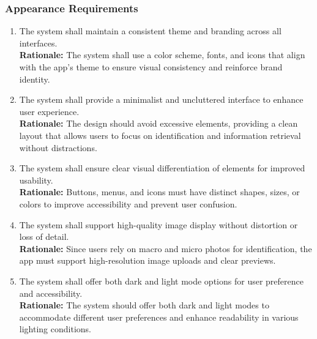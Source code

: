 \documentclass[]{article}
\begin{document}
\begin{enumerate}[{\bf BE1.}]
\subsubsection{Appearance Requirements}
\label{ssub:appearance_requirements}
\begin{enumerate}[{LF-A}1. ]
	\item The system shall maintain a consistent theme and branding across all interfaces.\\
	\textbf{Rationale:} The system shall use a color scheme, fonts, and icons that align with the app’s theme to ensure visual consistency and reinforce brand identity.
	\item The system shall provide a minimalist and uncluttered interface to enhance user experience.\\
	\textbf{Rationale:} The design should avoid excessive elements, providing a clean layout that allows users to focus on identification and information retrieval without distractions.
	\item The system shall ensure clear visual differentiation of elements for improved usability.\\
	\textbf{Rationale:} Buttons, menus, and icons must have distinct shapes, sizes, or colors to improve accessibility and prevent user confusion.
	\item The system shall support high-quality image display without distortion or loss of detail.\\
	\textbf{Rationale:} Since users rely on macro and micro photos for identification, the app must support high-resolution image uploads and clear previews.
	\item The system shall offer both dark and light mode options for user preference and accessibility.\\
	\textbf{Rationale:} The system should offer both dark and light modes to accommodate different user preferences and enhance readability in various lighting conditions.
\end{enumerate}


\end{enumerate}
\end{document}
